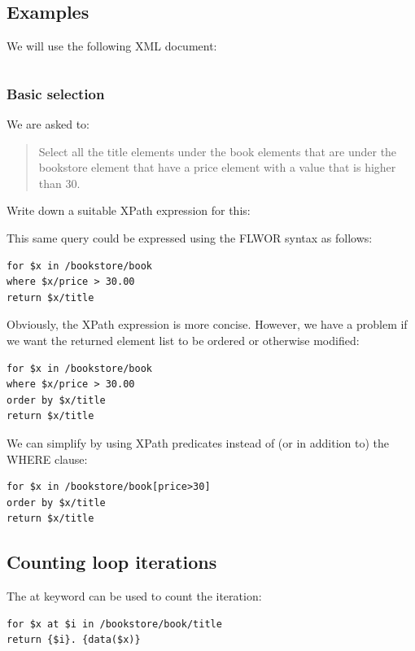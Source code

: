 \documentclass{pgnotes}
\begin{document}
\subsection{Examples}

We will use the following XML document:

\inputminted{xml}{books.xml}


\subsubsection{Basic selection}

We are asked to:
\begin{quotation}
Select all the title elements under the book elements that are under the bookstore element that have a price element with a value that is higher than 30.
\end{quotation}

Write down a suitable XPath expression for this: 

\vspace{\fill}

This same query could be expressed using the FLWOR syntax as follows:

\begin{verbatim}
for $x in /bookstore/book
where $x/price > 30.00
return $x/title
\end{verbatim}

Obviously, the XPath expression is more concise. 
However, we have a problem if we want the returned element list to be ordered or otherwise modified:

\begin{verbatim}
for $x in /bookstore/book
where $x/price > 30.00
order by $x/title
return $x/title
\end{verbatim}

We can simplify by using XPath predicates instead of (or in addition to) the WHERE clause: 

\begin{verbatim}
for $x in /bookstore/book[price>30]
order by $x/title
return $x/title
\end{verbatim}

\subsection{Counting loop iterations}

The at keyword can be used to count the iteration:

\begin{verbatim}
for $x at $i in /bookstore/book/title
return {$i}. {data($x)}
\end{verbatim}
\end{document}
